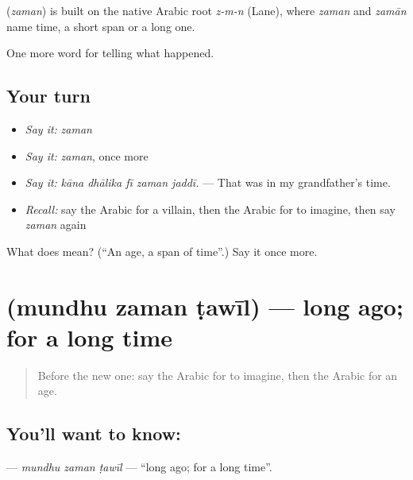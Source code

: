 \begin{cousinweb}
\textbf{} (\emph{zaman}) is built on the native Arabic root \emph{z-m-n} (Lane), where \emph{zaman} and \emph{zamān} name time, a short span or a long one.
\end{cousinweb}

\begin{grammarlens}[title={What you've built}]
One more word for telling what happened.
\end{grammarlens}

\subsection*{Your turn}
\begin{itemize}
\raggedright
  \item \emph{Say it:} \emph{zaman}
  \item \emph{Say it:} \emph{zaman}, once more
  \item \emph{Say it:} \emph{kāna dhālika fī zaman jaddī.} — That was in my grandfather’s time.
  \item \emph{Recall:} say the Arabic for a villain, then the Arabic for to imagine, then say \emph{zaman} again
\end{itemize}

\begin{tcolorbox}[breakable,colback=teal!4,colframe=teal!35!black,title={Before you move on}]
What does  mean? (\textquotedblleft{}An age, a span of time\textquotedblright{}.) Say it once more.
\end{tcolorbox}
\section[\texorpdfstring{\ar{منذ} \ar{زمن} \ar{طويل} (mundhu zaman ṭawīl)}{منذ زمن طويل (mundhu zaman ṭawīl)}]{   (mundhu zaman ṭawīl) — long ago; for a long time}

\label{lesson:AR-C304-mundhu-zaman-tawil}



\begin{quote}
Before the new one: say the Arabic for to imagine, then the Arabic for an age.
\end{quote}

\subsection*{You'll want to know:   }
\textbf{  } — \emph{mundhu zaman ṭawīl} — \textquotedblleft{}long ago; for a long time\textquotedblright{}.

